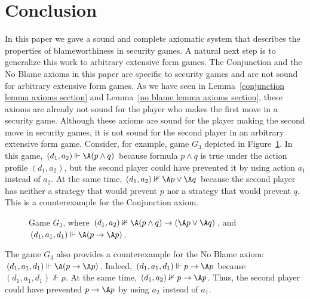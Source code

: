 \documentclass[letterpaper]{article}
\begin{document}
\section{Conclusion}

In this paper we gave a sound and complete axiomatic system that describes the properties of blameworthiness in security games. A natural next step is to generalize this work to arbitrary extensive form games. The Conjunction and the No Blame axioms in this paper are specific to security games and are not sound for arbitrary extensive form games. As we have seen in Lemma~\ref{conjunction lemma axioms section} and Lemma~\ref{no blame lemma axioms section}, these axioms are already not sound for the player who makes the first move in a security game. Although these axioms are sound for the player making the second move in security games, it is not sound for the second player in an arbitrary extensive form game. Consider, for example, game $G_3$ depicted in Figure~\ref{conclusion figure}. In this game, $(d_1,a_2)\Vdash \A(p\wedge q)$ because formula $p\wedge q$ is true under the action profile $(d_1,a_2)$, but the second player could have prevented it by using action $a_1$ instead of $a_2$. At the same time,  $(d_1,a_2)\nVdash \A p\vee  \A q$ because the second player has neither a strategy that would prevent $p$ nor a strategy that would prevent $q$. This is a counterexample for the Conjunction axiom.
\begin{figure}[ht]\label{conclusion figure}
\begin{center}
\caption{Game $G_3$, where $(d_1,a_2)\nVdash \A(p\wedge q)\to(\A p\vee\A q)$, and $(d_1,a_1,d_1)\Vdash \A(p\to\A p)$.
}\label{conclusion figure}
\end{center}
\end{figure}
The game $G_3$ also provides a counterexample for the No Blame axiom: $(d_1,a_1,d_1)\Vdash \A(p\to\A p)$. Indeed, $(d_1,a_1,d_1)\Vdash p\to\A p$ because $(d_1,a_1,d_1)\nVdash p$. At the same time, $(d_1,a_2)\nVdash p\to\A p$. Thus, the second player could have prevented $p\to\A p$ by using $a_2$ instead of $a_1$.
\end{document}
